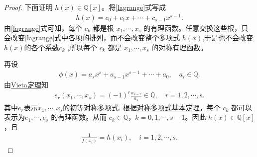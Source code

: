 \documentclass[../../main.tex]{subfiles}%
\begin{document}
\begin{proof}
下面证明 $h(x)\in\mathbb{Q}[x]$。将\eqref{lagrange}式写成
\begin{align}
h(x)=c_0+c_1x+\cdots+c_{s-1}x^{s-1}. \label{coef}
\end{align}
由\eqref{lagrange}式可知，每个 $c_k$ 都是根 $x_1,\cdots,x_s$ 的有理函数。任意交换这些根，只会改变\eqref{lagrange}式中各项的排列，而不会改变整个多项式 $h(x)$,于是也不会改变$h(x)$的各个系数$c_k$ ,所以每个 $c_k$ 都是 $x_1,\cdots,x_s$ 的对称有理函数。

再设
\begin{align*}
\phi(x)=a_sx^s+a_{s-1}x^{s-1}+\cdots+a_0,\quad a_i\in\mathbb{Q}.
\end{align*}
由\hyperref[theorem:Vieta定理]{Vieta定理}知
\begin{align*}
e_r(x_1,\cdots,x_s)=(-1)^r\frac{a_{s-r}}{a_s}\in\mathbb{Q},\quad r=1,2,\cdots,s.
\end{align*}
其中$e_r$表示$x_1,\cdots,x_s$的初等对称多项式.
根据\hyperref[Abstract Algebra-theorem:抽象代数--定理2.3.1--对称多项式基本定理]{对称多项式基本定理}，每个 $c_k$ 都可以表示为$e_1,\cdots,e_s$ 的有理函数。从而 $c_k\in\mathbb{Q}$，$k=0,1,\cdots,s-1$。因此 $h(x)\in\mathbb{Q}[x]$，且
\begin{align*}
\frac{1}{f(x_i)}=h(x_i),\quad i=1,2,\cdots,s. 
\end{align*}
\end{proof}
\end{document}
